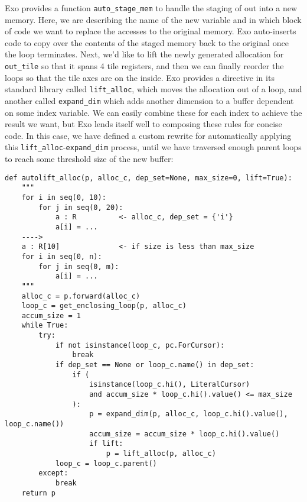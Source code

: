 \documentclass[acmsmall, nonacm=true]{acmart}
\begin{document}
Exo provides a function \verb|auto_stage_mem| to handle the staging of out into a new memory. Here, we are describing the name of the new variable and in which block of code we want to replace the accesses to the original memory. Exo auto-inserts code to copy over the contents of the staged memory back to the original once the loop terminates. 
Next, we'd like to lift the newly generated allocation for \verb|out_tile| so that it spans 4 tile registers, and then we can finally reorder the loops so that the tile axes are on the inside. Exo provides a directive in its standard library called \verb|lift_alloc|, which moves the allocation out of a loop, and another called \verb|expand_dim| which adds another dimension to a buffer dependent on some index variable. We can easily combine these for each index to achieve the result we want, but Exo lends itself well to composing these rules for concise code. In this case, we have defined a custom rewrite for automatically applying this \verb|lift_alloc|-\verb|expand_dim| process, until we have traversed enough parent loops to reach some threshold size of the new buffer:
\begin{verbatim}
def autolift_alloc(p, alloc_c, dep_set=None, max_size=0, lift=True):
    """
    for i in seq(0, 10):
        for j in seq(0, 20):
            a : R          <- alloc_c, dep_set = {'i'}
            a[i] = ...
    ---->
    a : R[10]              <- if size is less than max_size
    for i in seq(0, n):
        for j in seq(0, m):
            a[i] = ...
    """
    alloc_c = p.forward(alloc_c)
    loop_c = get_enclosing_loop(p, alloc_c)
    accum_size = 1
    while True:
        try:
            if not isinstance(loop_c, pc.ForCursor):
                break
            if dep_set == None or loop_c.name() in dep_set:
                if (
                    isinstance(loop_c.hi(), LiteralCursor)
                    and accum_size * loop_c.hi().value() <= max_size
                ):
                    p = expand_dim(p, alloc_c, loop_c.hi().value(), loop_c.name())
                    accum_size = accum_size * loop_c.hi().value()
                    if lift:
                        p = lift_alloc(p, alloc_c)
            loop_c = loop_c.parent()
        except:
            break
    return p
\end{verbatim}
\end{document}
